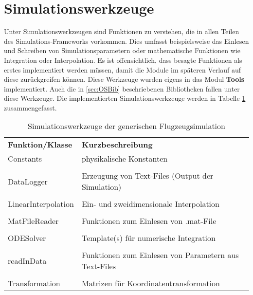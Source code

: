 \section{Simulationswerkzeuge}
Unter Simulationswerkzeugen sind Funktionen zu verstehen, die in allen Teilen des Simulations-Frameworks vorkommen. Dies umfasst beispielsweise das Einlesen und Schreiben von Simulationsparametern oder mathematische Funktionen wie Integration oder Interpolation. Es ist offensichtlich, dass besagte Funktionen als erstes implementiert werden müssen, damit die Module im späteren Verlauf auf diese zurückgreifen können. Diese Werkzeuge wurden eigens in das Modul \textbf{Tools} implementiert. Auch die in \ref{sec:OSBib} beschriebenen Bibliotheken fallen unter diese Werkzeuge. Die implementierten Simulationswerkzeuge werden in Tabelle \ref{tab: SimWerk} zusammengefasst.
\begin{table}[h]
\centering	\begin{tabular}{lp{11cm}}
		\textbf{Funktion/Klasse} & \textbf{Kurzbeschreibung}\\
		 Constants & physikalische Konstanten\\\\
		 DataLogger & Erzeugung von Text-Files (Output der Simulation)\\\\
		 LinearInterpolation & Ein- und zweidimensionale Interpolation \\\\
		 MatFileReader & Funktionen zum Einlesen von .mat-File\\\\
		 ODESolver & Template(s) für numerische Integration\\\\
		 readInData & Funktionen zum Einlesen von Parametern aus Text-Files\\\\
		 Transformation & Matrizen für Koordinatentransformation
	\end{tabular}
\caption{Simulationswerkzeuge der generischen Flugzeugsimulation}
\label{tab: SimWerk}
\end{table}
\newpage
